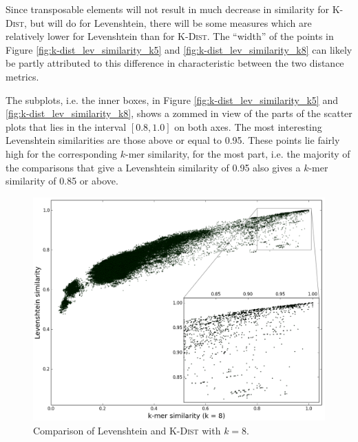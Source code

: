Since transposable elements will not result in much decrease in similarity for
\textsc{K-Dist}, but will do for Levenshtein, there will be some measures which
are relatively lower for Levenshtein than for \textsc{K-Dist}. The ``width'' of
the points in Figure \ref{fig:k-dist_lev_similarity_k5} and
\ref{fig:k-dist_lev_similarity_k8} can likely be partly attributed to this
difference in characteristic between the two distance metrics.

The subplots, i.e. the inner boxes, in Figure
\ref{fig:k-dist_lev_similarity_k5} and \ref{fig:k-dist_lev_similarity_k8},
shows a zommed in view of the parts of the scatter plots that lies in the
interval $[0.8,1.0]$ on both axes. The most interesting Levenshtein
similarities are those above or equal to 0.95. These points lie fairly high for
the corresponding $k$-mer similarity, for the most part, i.e. the majority of
the comparisons that give a Levenshtein similarity of 0.95 also gives a $k$-mer
similarity of 0.85 or above.

\begin{figure}[h!]
  \includegraphics[width=1.0\textwidth]{graphics/Levenshtein_K-Dist_k8.png}
  \caption{Comparison of Levenshtein and \textsc{K-Dist} with $k=8$.}
  \label{fig:k-dist_lev_similarity_k8}
  \label{fig:Levenshtein_vs_KDist}
\end{figure}




